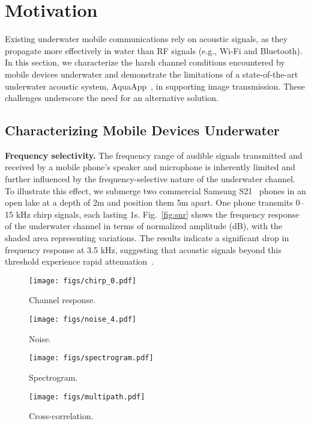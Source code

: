 
\section{Motivation}\label{sec:background}

Existing underwater mobile communications rely on acoustic signals,
as they propagate more effectively in water than RF signals (e.g., Wi-Fi and Bluetooth).
In this section, we characterize the harsh channel conditions encountered by
mobile devices underwater and demonstrate the limitations of a state-of-the-art
underwater acoustic system, AquaApp~\cite{chen2022underwater},
in supporting image transmission. These challenges underscore the need for an
alternative solution.

\subsection{Characterizing Mobile Devices Underwater}\label{sec:mov_channel}



\noindent\textbf{Frequency selectivity.} The frequency range of audible signals transmitted and received by a mobile phone's speaker and microphone is inherently limited and further influenced by the frequency-selective nature of the underwater channel. To illustrate this effect, we submerge two commercial Samsung S21~\cite{Samsung} phones in an open lake at a depth of 2m and position them 5m apart. One phone transmits 0--15 kHz chirp signals,
each lasting 1s.
Fig.~\ref{fig:snr} shows the frequency response of the underwater channel in terms of normalized amplitude (dB), with the shaded area representing variations.
The results indicate a significant drop in frequency response at 3.5 kHz,
suggesting that acoustic signals beyond this threshold experience
rapid attenuation~\cite{chen2022underwater,yang2023aquahelper}.


\begin{figure*}[t]
    \centering
    \begin{minipage}[b]{0.24\textwidth}
        \centering
        \texttt{[image: figs/chirp\_0.pdf]}
        \caption{Channel response.}
        \label{fig:snr}
    \end{minipage}
    \begin{minipage}[b]{0.24\textwidth}
        \centering
        \texttt{[image: figs/noise\_4.pdf]}
        \caption{Noise.}
        \label{fig:noise}
    \end{minipage}
    \begin{minipage}[b]{0.24\textwidth}
        \centering
        \texttt{[image: figs/spectrogram.pdf]}
        \caption{Spectrogram.}
        \label{fig:spectrogram}
    \end{minipage}
    \begin{minipage}[b]{0.24\textwidth}
        \centering
        \texttt{[image: figs/multipath.pdf]}
        \caption{Cross-correlation.}
        \label{fig:multipath}
    \end{minipage}
\end{figure*}

